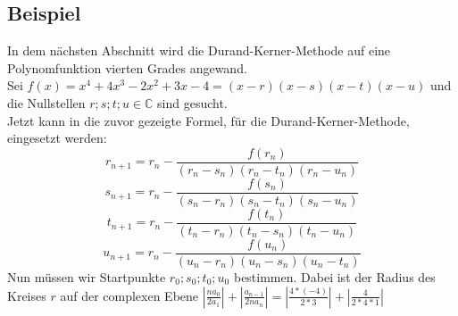 \documentclass[12pt]{article}
\begin{document}
    \subsection{Beispiel}
        In dem nächsten Abschnitt wird die Durand-Kerner-Methode auf eine Polynomfunktion vierten Grades angewand. \\
        Sei $f(x) = x^4 + 4x^3 - 2x^2 + 3x - 4 = (x-r)(x-s)(x-t)(x-u)$ und die Nullstellen $r;s;t;u \in \mathbb{C}$ sind gesucht. \\
        Jetzt kann in die zuvor gezeigte Formel, für die Durand-Kerner-Methode, eingesetzt werden:
        \begin{displaymath}
            r_{n+1} = r_n-\frac{f(r_n)}{(r_n-s_n)(r_n-t_n)(r_n-u_n)}
        \end{displaymath}
        \begin{displaymath}
            s_{n+1} = r_n-\frac{f(s_n)}{(s_n-r_n)(s_n-t_n)(s_n-u_n)}
        \end{displaymath}
        \begin{displaymath}
            t_{n+1} = r_n-\frac{f(t_n)}{(t_n-r_n)(t_n-s_n)(t_n-u_n)}
        \end{displaymath}
        \begin{displaymath}
            u_{n+1} = r_n-\frac{f(u_n)}{(u_n-r_n)(u_n-s_n)(u_n-t_n)}
        \end{displaymath}
        \vspace{0.2cm}
        Nun müssen wir Startpunkte $r_0;s_0;t_0;u_0$ bestimmen. Dabei ist der Radius des Kreises $r$ auf der complexen Ebene $|\frac{na_0}{2a_1}| + |\frac{a_{n-1}}{2na_n}| = |\frac{4 * (-4)}{2 * 3}| + |\frac{4}{2 * 4 * 1}|$
\end{document}
